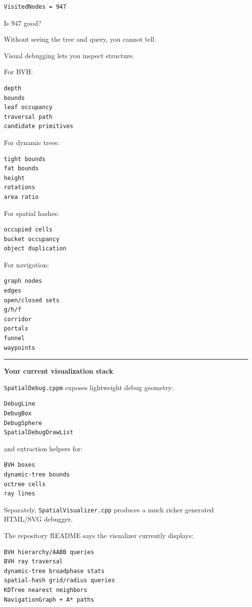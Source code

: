 \begin{verbatim}
VisitedNodes = 947
\end{verbatim}

Is 947 good?

Without seeing the tree and query, you cannot tell.

Visual debugging lets you inspect structure.

For BVH:

\begin{verbatim}
depth
bounds
leaf occupancy
traversal path
candidate primitives
\end{verbatim}

For dynamic trees:

\begin{verbatim}
tight bounds
fat bounds
height
rotations
area ratio
\end{verbatim}

For spatial hashes:

\begin{verbatim}
occupied cells
bucket occupancy
object duplication
\end{verbatim}

For navigation:

\begin{verbatim}
graph nodes
edges
open/closed sets
g/h/f
corridor
portals
funnel
waypoints
\end{verbatim}

\begin{center}\rule{0.5\linewidth}{0.5pt}\end{center}

\textbf{Your current visualization stack}

\texttt{SpatialDebug.cppm} exposes lightweight debug geometry:

\begin{verbatim}
DebugLine
DebugBox
DebugSphere
SpatialDebugDrawList
\end{verbatim}

and extraction helpers for:

\begin{verbatim}
BVH boxes
dynamic-tree bounds
octree cells
ray lines
\end{verbatim}

Separately, \texttt{SpatialVisualizer.cpp} produces a much richer generated HTML/SVG debugger.

The repository README says the visualizer currently displays:

\begin{verbatim}
BVH hierarchy/AABB queries
BVH ray traversal
dynamic-tree broadphase stats
spatial-hash grid/radius queries
KDTree nearest neighbors
NavigationGraph + A* paths
\end{verbatim}

